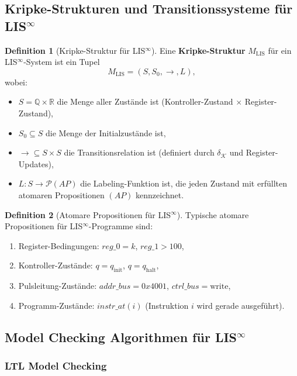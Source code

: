 \documentclass[a4paper,12pt]{article}
\theoremstyle{definition}
\newtheorem{definition}{Definition}
\begin{document}
\subsection{Kripke-Strukturen und Transitionssysteme für LIS$^{\infty}$}

\begin{definition}[Kripke-Struktur für LIS$^{\infty}$]
	\label{def:kripke_lis}
	Eine \textbf{Kripke-Struktur} $M_{\text{LIS}}$ für ein LIS$^{\infty}$-System ist ein Tupel
	\[
	M_{\text{LIS}} = (S, S_0, \to, L),
	\]
	wobei:
	\begin{itemize}
		\item $S = \mathbb{Q} \times \mathbb{R}$ die Menge aller Zustände ist (Kontroller-Zustand $\times$ Register-Zustand),
		\item $S_0 \subseteq S$ die Menge der Initialzustände ist,
		\item $\to \subseteq S \times S$ die Transitionsrelation ist (definiert durch $\delta_{\mathcal{K}}$ und Register-Updates),
		\item $L : S \to \mathcal{P}(AP)$ die Labeling-Funktion ist, die jeden Zustand mit erfüllten atomaren Propositionen $(AP)$ kennzeichnet.
	\end{itemize}
\end{definition}

\begin{definition}[Atomare Propositionen für LIS$^{\infty}$]
	\label{def:atomare_prop_lis}
	Typische atomare Propositionen für LIS$^{\infty}$-Programme sind:
	\begin{enumerate}
		\item Register-Bedingungen: $reg\_0 = k$, $reg\_1 > 100$,
		\item Kontroller-Zustände: $q = q_{\text{init}}$, $q = q_{\text{halt}}$,
		\item Pulsleitung-Zustände: $addr\_bus = 0x4001$, $ctrl\_bus = \text{write}$,
		\item Programm-Zustände: $instr\_at(i)$ (Instruktion $i$ wird gerade ausgeführt).
	\end{enumerate}
\end{definition}

\subsection{Model Checking Algorithmen für LIS$^{\infty}$}

\subsubsection{LTL Model Checking}
\end{document}
